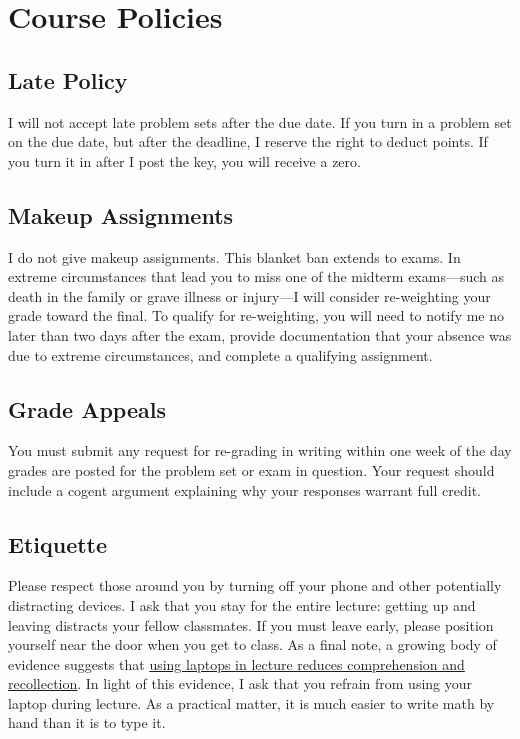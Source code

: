 \documentclass[10pt]{article}
\begin{document}
\newpage

\section*{Course Policies}

\subsection*{Late Policy} 

I will not accept late problem sets after the due date. If you turn in a problem set on the due date, but after the deadline, I reserve the right to deduct points. If you turn it in after I post the key, you will receive a zero.

\subsection*{Makeup Assignments} 

I do not give makeup assignments. This blanket ban extends to exams. In extreme circumstances that lead you to miss one of the midterm exams---such as death in the family or grave illness or injury---I will consider re-weighting your grade toward the final. To qualify for re-weighting, you will need to notify me no later than two days after the exam, provide documentation that your absence was due to extreme circumstances, and complete a qualifying assignment.

\subsection*{Grade Appeals} 

You must submit any request for re-grading in writing within one week of the day grades are posted for the problem set or exam in question. Your request should include a cogent argument explaining why your responses warrant full credit.

\subsection*{Etiquette} 

Please respect those around you by turning off your phone and other potentially distracting devices. I ask that you stay for the entire lecture: getting up and leaving distracts your fellow classmates. If you must leave early, please position yourself near the door when you get to class. As a final note, a growing body of evidence suggests that \href{https://www.theverge.com/2017/11/27/16703904/laptop-learning-lecture}{using laptops in lecture reduces comprehension and recollection}. In light of this evidence, I ask that you refrain from using your laptop during lecture. As a practical matter, it is much easier to write math by hand than it is to type it. 
\end{document}
